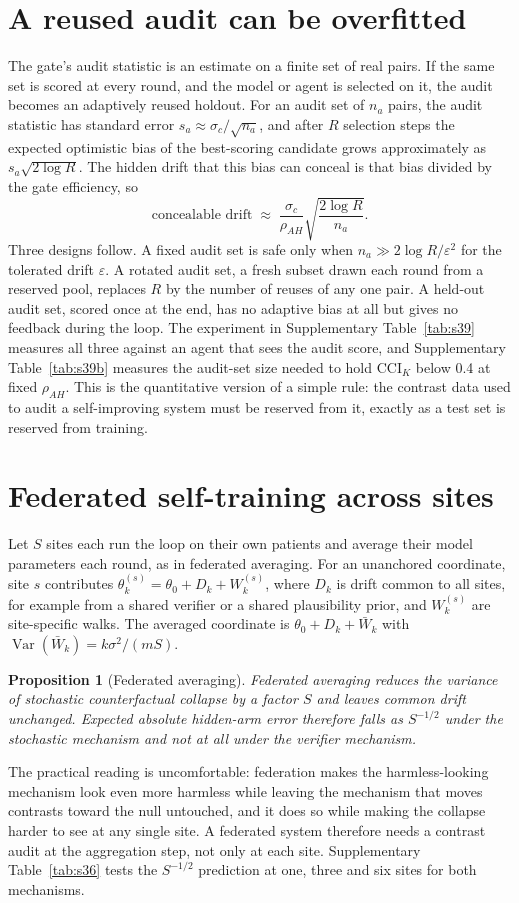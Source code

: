 \documentclass[11pt,a4paper]{article}
\newcommand{\Var}{\operatorname{Var}}
\newcommand{\CCI}{\mathrm{CCI}}
\newtheorem{proposition}{Proposition}[section]
\begin{document}
\section{A reused audit can be overfitted}
The gate's audit statistic is an estimate on a finite set of real pairs. If the same set is scored at every round, and the model or agent is selected on it, the audit becomes an adaptively reused holdout. For an audit set of $n_a$ pairs, the audit statistic has standard error $s_a\approx\sigma_c/\sqrt{n_a}$, and after $R$ selection steps the expected optimistic bias of the best-scoring candidate grows approximately as $s_a\sqrt{2\log R}$. The hidden drift that this bias can conceal is that bias divided by the gate efficiency, so
\begin{equation}
\text{concealable drift}\;\approx\;\frac{\sigma_c}{\rho_{AH}}\sqrt{\frac{2\log R}{n_a}} .
\end{equation}
Three designs follow. A fixed audit set is safe only when $n_a\gg 2\log R/\varepsilon^2$ for the tolerated drift $\varepsilon$. A rotated audit set, a fresh subset drawn each round from a reserved pool, replaces $R$ by the number of reuses of any one pair. A held-out audit set, scored once at the end, has no adaptive bias at all but gives no feedback during the loop. The experiment in Supplementary Table~\ref{tab:s39} measures all three against an agent that sees the audit score, and Supplementary Table~\ref{tab:s39b} measures the audit-set size needed to hold $\CCI_K$ below 0.4 at fixed $\rho_{AH}$. This is the quantitative version of a simple rule: the contrast data used to audit a self-improving system must be reserved from it, exactly as a test set is reserved from training.

\section{Federated self-training across sites}
Let $S$ sites each run the loop on their own patients and average their model parameters each round, as in federated averaging. For an unanchored coordinate, site $s$ contributes $\theta^{(s)}_k=\theta_0+D_k+W^{(s)}_k$, where $D_k$ is drift common to all sites, for example from a shared verifier or a shared plausibility prior, and $W^{(s)}_k$ are site-specific walks. The averaged coordinate is $\theta_0+D_k+\bar W_k$ with $\Var(\bar W_k)=k\sigma^2/(mS)$.
\begin{proposition}[Federated averaging]
Federated averaging reduces the variance of stochastic counterfactual collapse by a factor $S$ and leaves common drift unchanged. Expected absolute hidden-arm error therefore falls as $S^{-1/2}$ under the stochastic mechanism and not at all under the verifier mechanism.
\end{proposition}
The practical reading is uncomfortable: federation makes the harmless-looking mechanism look even more harmless while leaving the mechanism that moves contrasts toward the null untouched, and it does so while making the collapse harder to see at any single site. A federated system therefore needs a contrast audit at the aggregation step, not only at each site. Supplementary Table~\ref{tab:s36} tests the $S^{-1/2}$ prediction at one, three and six sites for both mechanisms.
\end{document}
